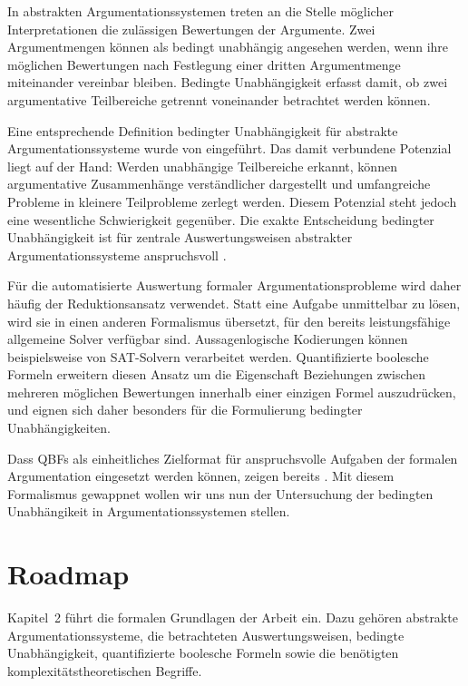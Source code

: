In abstrakten Argumentationssystemen treten an die Stelle möglicher Interpretationen die zulässigen Bewertungen der Argumente.
Zwei Argumentmengen können als bedingt unabhängig angesehen werden, wenn ihre möglichen Bewertungen nach Festlegung einer 
dritten Argumentmenge miteinander vereinbar bleiben. Bedingte Unabhängigkeit erfasst damit, ob zwei argumentative 
Teilbereiche getrennt voneinander betrachtet werden können.

Eine entsprechende Definition bedingter Unabhängigkeit für abstrakte Argumentationssysteme wurde von \textcite{rienstra:2020:independence-af} eingeführt. 
Das damit verbundene Potenzial liegt auf der Hand: Werden unabhängige Teilbereiche erkannt, können argumentative Zusammenhänge verständlicher dargestellt 
und umfangreiche Probleme in kleinere Teilprobleme zerlegt werden. Diesem Potenzial steht jedoch eine wesentliche Schwierigkeit gegenüber. 
Die exakte Entscheidung bedingter Unabhängigkeit ist für zentrale Auswertungsweisen abstrakter Argumentationssysteme anspruchsvoll \cite{bluemel:2025:independence-aba}.

Für die automatisierte Auswertung formaler Argumentationsprobleme wird daher häufig der Reduktionsansatz verwendet. 
Statt eine Aufgabe unmittelbar zu lösen, wird sie in einen anderen Formalismus übersetzt, für den bereits leistungsfähige 
allgemeine Solver verfügbar sind. Aussagenlogische Kodierungen können beispielsweise von SAT-Solvern verarbeitet werden. 
Quantifizierte boolesche Formeln erweitern diesen Ansatz um die Eigenschaft Beziehungen zwischen mehreren möglichen Bewertungen 
innerhalb einer einzigen Formel auszudrücken, und eignen sich daher besonders für die Formulierung bedingter Unabhängigkeiten.

Dass QBFs als einheitliches Zielformat für anspruchsvolle Aufgaben der formalen Argumentation eingesetzt werden können, 
zeigen bereits \textcite{egly:woltran:2006:reasoning-qbf}.
Mit diesem Formalismus gewappnet wollen wir uns nun der Untersuchung der bedingten Unabhängikeit in Argumentationssystemen stellen.

\section{Roadmap}
\label{sec:einleitung-roadmap}

Kapitel~2 führt die formalen Grundlagen der Arbeit ein. Dazu gehören abstrakte Argumentationssysteme, die betrachteten Auswertungsweisen, 
bedingte Unabhängigkeit, quantifizierte boolesche Formeln sowie die benötigten komplexitätstheoretischen Begriffe.

